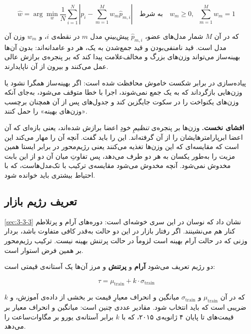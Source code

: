 \begin{equation}
\hat{w} = \arg\min_{w}
\frac{1}{N}\sum_{i=1}^{N}\left| p_i - \sum_{m=1}^{M} w_m \hat{p}_{m,i} \right|
\quad \text{به شرط} \quad
w_m \geq 0, \;\; \sum_{m=1}^{M} w_m = 1
\end{equation}

که در آن $M$ شمار مدل‌های عضو، $\hat{p}_{m,i}$ پیش‌بینیِ مدل $m$ در نقطه‌ی $i$، و
$w_m$ وزن آن مدل است. قید نامنفی‌بودن و قید جمع‌شدن به یک، هر دو عامدانه‌اند: بدون
آن‌ها بهینه‌ساز می‌تواند وزن‌های بزرگ و مخالف‌علامت پیدا کند که بر پنجره‌ی برازش عالی
عمل می‌کنند و بیرون از آن ناپایدارند.

پیاده‌سازی در برابر شکست خاموش محافظت شده است: اگر بهینه‌ساز همگرا نشود یا وزن‌هایی
بازگرداند که به یک جمع نمی‌شوند، اجرا با خطا متوقف می‌شود، به‌جای آنکه وزن‌های
یکنواخت را در سکوت جایگزین کند و جدول‌های پس از آن همچنان برچسب «وزن‌های بهینه» را
حمل کنند.

\textbf{افشای نخست.} وزن‌ها بر پنجره‌ی \emph{تنظیمِ} خودِ اعضا برازش شده‌اند، یعنی
بازه‌ای که آن اعضا ابرپارامترهایشان را از آن گرفته‌اند. این را باید گفت. آنچه آن را
مهار می‌کند این است که مقایسه‌ای که این وزن‌ها تغذیه می‌کنند  یعنی رژیم‌محور در
برابر ایستا  همین مزیت را به‌طور یکسان به هر دو طرف می‌دهد، پس تفاوتِ میان آن
دو از این بابت مخدوش نمی‌شود. آنچه مخدوش می‌شود مقایسه‌ی ترکیب با تک‌مدل‌هاست، که با
احتیاط بیشتری باید خوانده شود.

\subsection*{تعریف رژیم بازار}

\cref{sec:3-3-3} نشان داد که نوسان در این سری خوشه‌ای است: دوره‌های آرام و پرتلاطم کنار هم
می‌نشینند. اگر رفتار بازار در این دو حالت به‌قدر کافی متفاوت باشد، بردار وزنی که در
حالت آرام بهینه است لزوماً در حالت پرتنش بهینه نیست. ترکیب رژیم‌محور بر همین فرض
استوار است.

دو رژیم تعریف می‌شود  \textbf{آرام} و \textbf{پرتنش}  و مرز آن‌ها یک
آستانه‌ی قیمتی است:

\begin{equation}
\tau = \mu_{\mathrm{train}} + k \cdot \sigma_{\mathrm{train}}
\end{equation}

که در آن $\mu_{\mathrm{train}}$ و $\sigma_{\mathrm{train}}$ میانگین و انحراف معیارِ
قیمت بر بخشی از داده‌ی آموزش، و $k$ ضریبی است که باید انتخاب شود. مقادیر عددی چنین
است: میانگین  و انحراف معیار  بر قیمت‌های تا پایان ۴ ژانویه‌ی
۲۰۱۵، که با $k$ برابر  آستانه‌ی  یورو بر مگاوات‌ساعت را می‌دهد.

